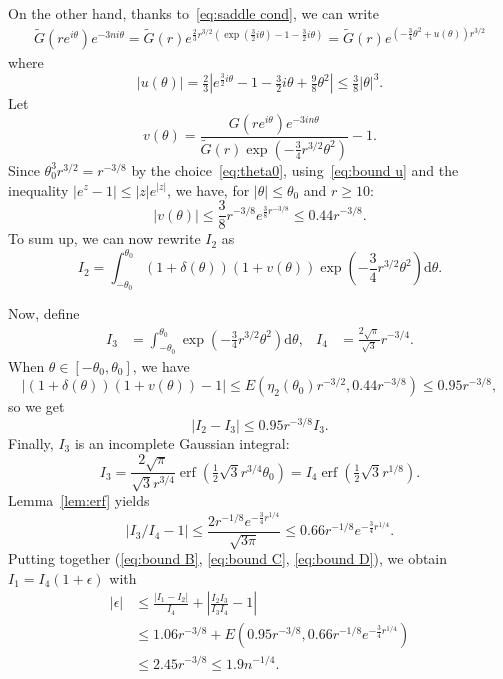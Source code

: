 \documentclass[10pt, conference]{IEEEtran}
\newcommand{\abs}[1]{\mathopen|#1\mathclose|}
\newcommand{\mathd}{\mathrm{d}}
\begin{document}
\begin{IEEEproof}
  On the other hand, thanks to~\eqref{eq:saddle cond}, we can write
  \begin{align*}
    \tilde{G}(re^{i{\theta}})e^{-3ni{\theta}}
    = \tilde{G}(r)e^{{\frac{2}{3}}r^{3/2}(\exp({\frac{3}{2}}i{\theta})-1-{\frac{3}{2}}i{\theta})}
    = \tilde{G}(r)e^{(-{\frac{3}{4}}{\theta}^2+u({\theta}))r^{3/2}}
  \end{align*}
  where
  \begin{equation}
    \abs{u(\theta)} = \tfrac{2}{3}\left|e^{\frac{3}{2} i \theta} -
    1 - \tfrac{3}{2} i \theta + \tfrac{9}{8} \theta^2\right| \leq
    \tfrac{3}{8} \abs{\theta}^3 . \label{eq:bound u}
  \end{equation}
  Let
  \[ v(\theta) = \frac{G(re^{i \theta}) e^{- 3 in
     \theta}}{\tilde{G}(r) \exp(- \frac{3}{4} r^{3 / 2}
     \theta^2)} - 1. \]
  Since $\theta_0^3 r^{3 / 2} = r^{- 3 / 8}$ by the
  choice~\eqref{eq:theta0}, using~\eqref{eq:bound u} and the
  inequality $\abs{e^z-1} \leq \abs{z} e^{\abs{z}}$, we
  have, for $\abs{\theta} \leq \theta_0$ and $r \ge 10$:
  \[ |v(\theta)| \leq \frac{3}{8}
     r^{- 3 / 8} e^{\frac{3}{8} r^{- 3 / 8}} \leq
     0.44 r^{- 3 / 8}. \]
  To sum up, we can now rewrite $I_2$ as
  \[
  I_2 = \int_{-\theta_0}^{{\theta}_0} (1+\delta(\theta))(1+v(\theta))\exp\left(-{\frac{3}{4}}r^{3/2}{\theta}^2\right){\mathd}{\theta}.
  \]

  Now, define
  \begin{align*}
    I_3 &= \int_{-{\theta}_0}^{{\theta}_0}\exp\left(-{\frac{3}{4}}r^{3/2}{\theta}^2\right){\mathd}{\theta},&
    I_4 &= {\frac{2\sqrt{{\pi}}}{\sqrt{3}}}r^{-3/4}.
  \end{align*}
  When $\theta \in [-\theta_0, \theta_0]$, we have
  \[
    \left|(1+\delta(\theta))(1+v(\theta))-1\right| \leq
    E({\eta}_2({\theta}_0)r^{-3/2},0.44r^{-3/8}) \leq 0.95r^{-3/8},
  \]
  so we get
  \begin{equation}
    \abs{I_2 - I_3} 
    \leq 0.95 r^{- 3 / 8} I_3 . \label{eq:bound C}
  \end{equation}
  Finally, $I_3$ is an incomplete Gaussian integral:
  \[ I_3 = \frac{2 \sqrt{\pi}}{\sqrt{3} r^{3 / 4}} \operatorname{erf}(
     \tfrac{1}{2} \sqrt{3} r^{3 / 4} \theta_0) = I_4 \operatorname{erf}(
     \tfrac{1}{2} \sqrt{3} r^{1 / 8}) . \]
  Lemma~\ref{lem:erf} yields
  \begin{equation}
    \abs{I_3 / I_4 - 1} \leq \frac{2 r^{- 1 / 8} e^{-
    \frac{3}{4} r^{1 / 4}}}{\sqrt{3 \pi}} \leq 0.66 r^{- 1 / 8} e^{-
    \frac{3}{4} r^{1 / 4}} . \label{eq:bound D}
  \end{equation}
  Putting together (\ref{eq:bound B}, \ref{eq:bound C},
  \ref{eq:bound D}), we obtain $I_1 = I_4(1+\epsilon)$ with
  \begin{align*}
    \left|\epsilon\right|
    &\leq \frac{\left|I_1-I_2\right|}{I_4} + \left|{\frac{I_2I_3}{I_3I_4}}-1\right|\\
    &\leq 1.06r^{-3/8} + E(0.95r^{-3/8}, 0.66r^{-1/8}e^{-{\frac{3}{4}}r^{1/4}})\\
    &\leq 2.45r^{-3/8} \leq 1.9 n^{-1/4}.
  \end{align*}


\end{IEEEproof}
\end{document}
